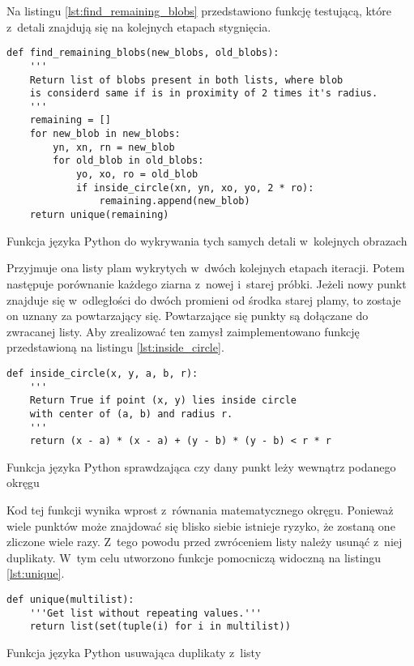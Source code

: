 Na listingu \ref{lst:find_remaining_blobs} przedstawiono funkcję testującą,
które z~detali znajdują się na kolejnych etapach stygnięcia.
\begin{listing}[htb]
\begin{verbatim}
def find_remaining_blobs(new_blobs, old_blobs):
    '''
    Return list of blobs present in both lists, where blob
    is considerd same if is in proximity of 2 times it's radius.
    '''
    remaining = []
    for new_blob in new_blobs:
        yn, xn, rn = new_blob
        for old_blob in old_blobs:
            yo, xo, ro = old_blob
            if inside_circle(xn, yn, xo, yo, 2 * ro):
                remaining.append(new_blob)
    return unique(remaining)
\end{verbatim}
\caption{Funkcja języka Python do wykrywania tych samych detali w~kolejnych
         obrazach}
\label{lst:find_remaining_blobs}
\end{listing}
Przyjmuje ona listy plam wykrytych w~dwóch kolejnych etapach iteracji.
Potem następuje porównanie każdego ziarna z~nowej i~starej próbki.
Jeżeli nowy punkt znajduje się w~odległości do dwóch promieni od środka
starej plamy, to zostaje on uznany za powtarzający się.
Powtarzające się punkty są dołączane do zwracanej listy.
Aby zrealizować ten zamysł zaimplementowano funkcję przedstawioną na listingu
\ref{lst:inside_circle}.
\begin{listing}[htb]
\begin{verbatim}
def inside_circle(x, y, a, b, r):
    '''
    Return True if point (x, y) lies inside circle 
    with center of (a, b) and radius r.
    '''
    return (x - a) * (x - a) + (y - b) * (y - b) < r * r
\end{verbatim}
\caption{Funkcja języka Python sprawdzająca czy dany punkt leży wewnątrz
         podanego okręgu}
\label{lst:inside_circle}
\end{listing}
Kod tej funkcji wynika wprost z~równania matematycznego okręgu.
Ponieważ wiele punktów może znajdować się blisko siebie istnieje ryzyko,
że zostaną one zliczone wiele razy.
Z~tego powodu przed zwróceniem listy należy usunąć z~niej duplikaty.
W~tym celu utworzono funkcje pomocniczą widoczną na listingu \ref{lst:unique}.
\begin{listing}[htb]
\begin{verbatim}
def unique(multilist):
    '''Get list without repeating values.'''
    return list(set(tuple(i) for i in multilist))
\end{verbatim}
\caption{Funkcja języka Python usuwająca duplikaty z~listy}
\label{lst:unique}
\end{listing}
